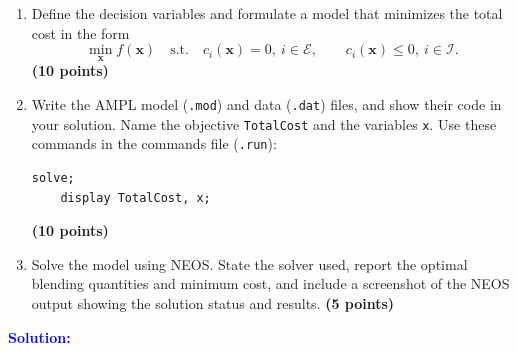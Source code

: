\documentclass[10pt,a4paper]{article}
\newcommand{\solution}{\par\medskip
    \textcolor{blue}{\textbf{Solution:}}\par\smallskip}
\begin{document}
\begin{enumerate}
    \item Define the decision variables and formulate a model
    that minimizes the total cost in the form
    \[
        \min_{\mathbf{x}} f(\mathbf{x})
        \quad \text{s.t.} \quad
        c_i(\mathbf{x})=0,\ i\in\mathcal{E},
        \qquad
        c_i(\mathbf{x})\leq 0,\ i\in\mathcal{I}.
    \]
    \textbf{(10 points)}

    \item Write the AMPL model (\texttt{.mod}) and data (\texttt{.dat})
    files, and show their code in your solution.
    Name the objective \texttt{TotalCost} and the variables \texttt{x}.
    Use these commands in the commands file (\texttt{.run}):
    \begin{Verbatim}[frame=single,fontsize=\small]
    solve;
    display TotalCost, x;
    \end{Verbatim}
    \textbf{(10 points)}

    \item Solve the model using NEOS. State the solver used,
    report the optimal blending quantities and minimum cost,
    and include a screenshot of the NEOS output showing
    the solution status and results.
    \textbf{(5 points)}
\end{enumerate}


\solution
\end{document}
